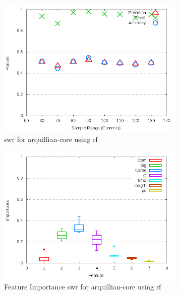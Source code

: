\begin{figure}[!t]
\centering
\includegraphics[width=0.8\textwidth]{images/rf/test_1/arquillian-core_sample_range.png}
\caption{\gls{swr} for arquillian-core using \gls{rf}}
\label{fig:test_1_arquillian-core_rf}
\end{figure}

\begin{figure}[!t]
\centering
\includegraphics[width=0.8\textwidth]{images/rf/test_1/arquillian-core_importance.png}
\caption{Feature Importance \gls{swr} for arquillian-core using \gls{rf}}
\label{fig:test_1_arquillian-core_rf_importance}
\end{figure}

\clearpage

